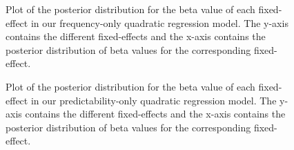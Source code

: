 \documentclass[
  authoryear,
  preprint,
  1p,
  onecolumn]{elsarticle}
\begin{document}
\begin{figure}


\caption{\label{fig-FreqOnlyBetaPlot}Plot of the posterior distribution
for the beta value of each fixed-effect in our frequency-only quadratic
regression model. The y-axis contains the different fixed-effects and
the x-axis contains the posterior distribution of beta values for the
corresponding fixed-effect.}

\end{figure}%

\begin{figure}


\caption{\label{fig-PredicOnlyBetaPlot}Plot of the posterior
distribution for the beta value of each fixed-effect in our
predictability-only quadratic regression model. The y-axis contains the
different fixed-effects and the x-axis contains the posterior
distribution of beta values for the corresponding fixed-effect.}

\end{figure}%
\end{document}
